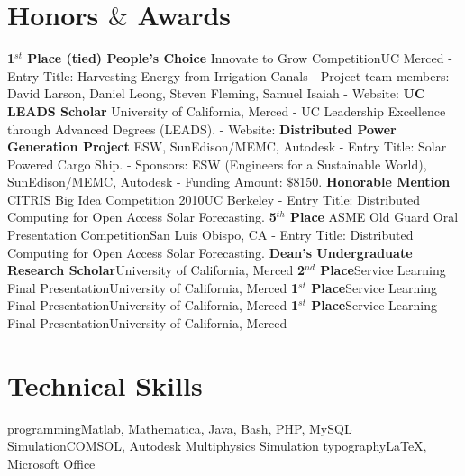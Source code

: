 \documentclass[11pt,a4paper]{moderncv}
\begin{document}
\section{\textbf{Honors $\&$ Awards}}
%
	{\textbf{1$^{st}$ Place (tied) People's Choice}}
	{Innovate to Grow Competition}{UC Merced}{}
	{
	- Entry Title: Harvesting Energy from Irrigation Canals \newline
	- Project team members: David Larson, Daniel Leong, Steven Fleming, Samuel Isaiah \newline
	- Website: {\color{web}{https://eng.ucmerced.edu/innovatetogrow}}
	}
	{\textbf{UC LEADS Scholar}}
    	{}{University of California, Merced}{}
    	{
    	- UC Leadership Excellence through Advanced Degrees (LEADS). \newline
    	- Website: {\color{web}{http://graduatedivision.ucmerced.edu/grad-prep-programs/uc-leads}}
    	}
	{\textbf{Distributed Power Generation Project}}
	{ESW, SunEdison/MEMC, Autodesk}{}{}
	{ 
	- Entry Title: Solar Powered Cargo Ship. \newline
    - Sponsors: ESW (Engineers for a Sustainable World), SunEdison/MEMC, Autodesk \newline
	- Funding Amount: $\$$8150.
	 }
	{\textbf{Honorable Mention}}
	{CITRIS Big Idea Competition 2010}{UC Berkeley}{}
	{ - Entry Title: Distributed Computing for Open Access Solar Forecasting.}
	{\textbf{5$^{th}$ Place}}
	{ASME Old Guard Oral Presentation Competition}{San Luis Obispo, CA}{}
	{ - Entry Title: Distributed Computing for Open Access Solar Forecasting.}
	{\textbf{Dean's Undergraduate Research Scholar}}{}{University of California, Merced}{}{}
	{\textbf{2$^{nd}$ Place}}{Service Learning Final Presentation}{University of California, Merced}{}{}
	{\textbf{1$^{st}$ Place}}{Service Learning Final Presentation}{University of California, Merced}{}{}
	{\textbf{1$^{st}$ Place}}{Service Learning Final Presentation}{University of California, Merced}{}{}



\section{\textbf{Technical Skills}}
 {programming}{Matlab, Mathematica, Java, Bash, PHP, MySQL}
 {Simulation}{COMSOL, Autodesk Multiphysics Simulation}
 {typography}{LaTeX, Microsoft Office}
\end{document}
